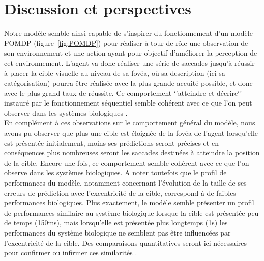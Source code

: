 
\chapter{Discussion et perspectives} %

\label{Discussion} %

Notre modèle semble ainsi capable de s'inspirer du fonctionnement d'un modèle POMDP (figure~\ref{fig:POMDP}) pour réaliser à tour de rôle une observation de son environnement et une action ayant pour objectif d'améliorer la perception de cet environnement.
L'agent va donc réaliser une série de saccades jusqu'à réussir à placer la cible visuelle au niveau de sa fovéa, où sa description (ici sa catégorisation) pourra être réalisée avec la plus grande accuité possible, et donc avec le plus grand taux de réussite. Ce comportement `'atteindre-et-décrire`' instauré par le fonctionnement séquentiel semble cohérent avec ce que l'on peut observer dans les systèmes biologiques \autocite{Werner2014, Najemnik2005}. \\
En complément à ces observations sur le comportement général du modèle, nous avons pu observer que plus une cible est éloignée de la fovéa de l'agent lorsqu'elle est présentée initialement, moins ses prédictions seront précises et en conséquences plus nombreuses seront les saccades destinées à atteindre la position de la cible. 
Encore une fois, ce comportement semble cohérent avec ce que l'on observe dans les systèmes biologiques. 
A noter toutefois que le profil de performances du modèle, notamment concernant l'évolution de la taille de ses erreurs de prédiction avec l'excentricité de la cible, correspond à de faibles performances biologiques. 
Plus exactement, le modèle semble présenter un profil de performances similaire au système biologique lorsque la cible est présentée peu de temps (150ms), mais lorsqu'elle est présentée plus longtemps (1s) les performances du système biologique ne semblent pas être influencées par l'excentricité de la cible. Des comparaisons quantitatives seront ici nécessaires pour confirmer ou infirmer ces similarités \autocite{Uddin2004}.\\

	
